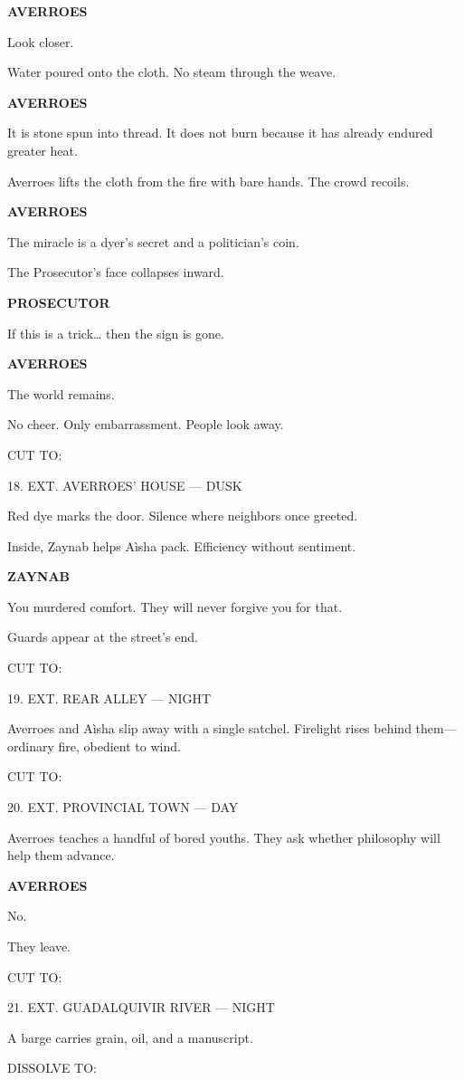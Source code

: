 \documentclass[12pt]{article}
\newlength{\charindent}
\newlength{\dialogueindent}
\newlength{\dialoguewidth}
\newlength{\transitionindent}
\newcommand{\slug}[1]{\vspace{1.25em}\textsc{#1}\vspace{0.5em}}
\newcommand{\action}[1]{#1}
\newcommand{\character}[1]{%
  \par\vspace{0.75em}%
  \hspace*{\charindent}\textbf{#1}%
}
\newcommand{\dialogue}[1]{%
  \par\nobreak
  \hspace*{\dialogueindent}%
  \begin{minipage}[t]{\dialoguewidth}
  #1
  \end{minipage}
}
\newcommand{\transition}[1]{%
  \par\vspace{1em}%
  \hspace*{\transitionindent}\textsc{#1}%
}
\begin{document}
\character{AVERROES}
\dialogue{Look closer.}

\action{Water poured onto the cloth. No steam through the weave.}

\character{AVERROES}
\dialogue{It is stone spun into thread. It does not burn because it has already endured greater heat.}

\action{Averroes lifts the cloth from the fire with bare hands. The crowd recoils.}

\character{AVERROES}
\dialogue{The miracle is a dyer’s secret and a politician’s coin.}

\action{The Prosecutor’s face collapses inward.}

\character{PROSECUTOR}
\dialogue{If this is a trick… then the sign is gone.}

\character{AVERROES}
\dialogue{The world remains.}

\action{No cheer. Only embarrassment. People look away.}

\transition{CUT TO:}

\slug{18. EXT. AVERROES’ HOUSE --- DUSK}

\action{Red dye marks the door. Silence where neighbors once greeted.}

\action{Inside, Zaynab helps A\`isha pack. Efficiency without sentiment.}

\character{ZAYNAB}
\dialogue{You murdered comfort. They will never forgive you for that.}

\action{Guards appear at the street’s end.}

\transition{CUT TO:}

\slug{19. EXT. REAR ALLEY --- NIGHT}

\action{Averroes and A\`isha slip away with a single satchel. Firelight rises behind them—ordinary fire, obedient to wind.}

\transition{CUT TO:}

\slug{20. EXT. PROVINCIAL TOWN --- DAY}

\action{Averroes teaches a handful of bored youths. They ask whether philosophy will help them advance.}

\character{AVERROES}
\dialogue{No.}

\action{They leave.}

\transition{CUT TO:}

\slug{21. EXT. GUADALQUIVIR RIVER --- NIGHT}

\action{A barge carries grain, oil, and a manuscript.}

\transition{DISSOLVE TO:}
\end{document}

